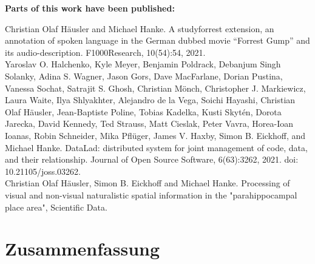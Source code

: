 \documentclass[english,12pt]{report}
\begin{document}
\begin{spacing}{1.5}
\noindent \textbf{Parts of this work have been published:}\\


\noindent Christian Olaf Häusler and Michael Hanke. A studyforrest extension, an
annotation of spoken language in the German dubbed movie “Forrest Gump” and its
audio-description. F1000Research, 10(54):54, 2021.\\

\noindent Yaroslav O. Halchenko, Kyle Meyer, Benjamin Poldrack, Debanjum Singh
Solanky, Adina S. Wagner, Jason Gors, Dave MacFarlane, Dorian Pustina, Vanessa
Sochat, Satrajit S. Ghosh, Christian Mönch, Christopher J. Markiewicz, Laura
Waite, Ilya Shlyakhter, Alejandro de la Vega, Soichi Hayashi, Christian Olaf
Häusler, Jean-Baptiste Poline, Tobias Kadelka, Kusti Skytén, Dorota Jarecka,
David Kennedy, Ted Strauss, Matt Cieslak, Peter Vavra, Horea-Ioan Ioanas, Robin
Schneider, Mika Pflüger, James V. Haxby, Simon B. Eickhoff, and Michael Hanke.
DataLad: distributed system for joint management of code, data, and their
relationship. Journal of Open Source Software, 6(63):3262, 2021. doi:
10.21105/joss.03262.\\

\noindent Christian Olaf Häusler, Simon B. Eickhoff and Michael Hanke.
Processing of visual and non-visual naturalistic spatial information in the
"parahippocampal place area", Scientific Data.






\chapter*{Zusammenfassung}
\setcounter{page}{1}




\end{spacing}
\end{document}
